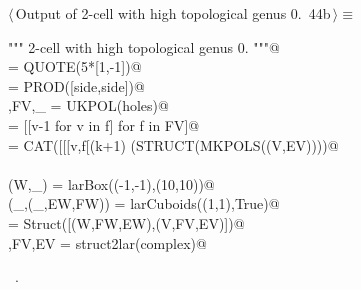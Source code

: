 \documentclass[11pt,oneside]{article}    %
\begin{document}
\begin{flushleft} \small \label{scrap74}
\protect{}$\langle\,$Output of 2-cell with high topological genus 0.\nobreak\ {\footnotesize 44b}$\,\rangle\equiv$
\vspace{-1ex}
\begin{list}{}{} \item
\mbox{}\verb@""" 2-cell with high topological genus 0. """@\\
\mbox{}\verb@side = QUOTE(5*[1,-1])@\\
\mbox{}\verb@holes = PROD([side,side])@\\
\mbox{}\verb@V,FV,_ = UKPOL(holes)@\\
\mbox{}\verb@FV = [[v-1 for v in f] for f in FV]@\\
\mbox{}\verb@EV = CAT([[[v,f[(k+1)%4]] for k,v in enumerate(f+[f[0]][:-1])] for f in FV])@\\
\mbox{}\verb@VIEW(STRUCT(MKPOLS((V,EV))))@\\
\mbox{}\verb@@\\
\mbox{}\verb@(W,_) = larBox((-1,-1),(10,10))@\\
\mbox{}\verb@(_,(_,EW,FW)) = larCuboids((1,1),True)@\\
\mbox{}\verb@complex = Struct([(W,FW,EW),(V,FV,EV)])@\\
\mbox{}\verb@V,FV,EV = struct2lar(complex)@\\
\mbox{}\verb@@{\NWsep}
\end{list}
\vspace{-1ex}
\footnotesize\addtolength{\baselineskip}{-1ex}
\begin{list}{}{\setlength{\itemsep}{-\parsep}\setlength{\itemindent}{-\leftmargin}}
\item \NWtxtMacroRefIn\ .
\end{list}
\end{flushleft}
\end{document}
